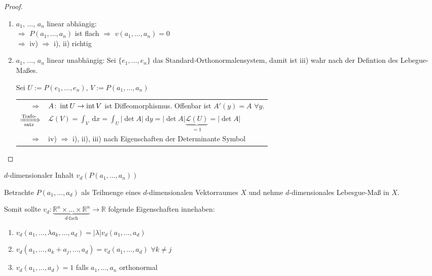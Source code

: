 \begin{proof}\hspace*{0pt}
	\NoEndMark
	\vspace*{-0.8\baselineskip}
	\begin{enumerate}[label={\alph*)}]
		\item $a_1$, $\dotsc$, $a_n$ linear abhängig:\\
		\hspace*{0.5em}$\Rightarrow$ $P(a_1,\dotsc, a_n)$ ist flach $\Rightarrow$ $v(a_1,\dotsc, a_n) = 0$ \\
		\hspace*{0.5em}$\Rightarrow$ iv) $\Rightarrow$ i), ii) richtig
		\item $a_1$, $\dotsc$, $a_n$ linear unabhängig: Sei $\{e_1,\dotsc, e_n\}$ das Standard-Orthonormalensystem, damit ist iii) wahr nach der Defintion des Lebegue-Maßes.
		
		Sei $U := P(e_1,\dotsc, e_n)$, $V:= P(a_1,\dotsc, a_n)$ \\\begin{tabularx}{\linewidth}{r@{$\;\;$}X}
		$\Rightarrow$& $A\colon \operatorname{int} U\to \operatorname{int} V$ ist Diffeomorphismus. Offenbar ist $A'(y) = A$ $\forall y$. \\
		$\xRightarrow[\text{satz}]{\text{Trafo-}}$ & $\displaystyle \mathcal{L}(V) = \int_V \;\mathrm{d}x = \int_U \vert \det A \vert \;\mathrm{d}y = \vert \det A\vert \underbrace{\mathcal{L}(U)}_{=1} = \vert \det A\vert$ \\
		$\Rightarrow$ & iv) $\Rightarrow$ i), ii), iii) nach Eigenschaften der Determinante \hfill \csname\InTheoType Symbol\endcsname
		\end{tabularx}
	\end{enumerate}
\end{proof}

\begin{underlinedenvironment}[Ziel]
	$d$-dimensionaler Inhalt $v_d(P(a_1,\dotsc,a_n))$
\end{underlinedenvironment}
\begin{underlinedenvironment}[Idee]
	Betrachte $P(a_1,\dotsc,a_d)$ als Teilmenge eines $d$-dimensionalen Vektorraumes $X$ und nehme $d$-dimensionales Lebesgue-Maß in $X$.
	
	Somit sollte $v_d\colon\underbrace{\mathbb{R}^n\times \dotsc\times\mathbb{R}^n}_{\text{$d$-fach}}\to\mathbb{R}$ folgende Eigenschaften innehaben:\begin{enumerate}[label={(V\arabic*)}]
		\item $v_d(a_1,\dotsc,\lambda a_k,\dotsc,a_d) = \vert\lambda\vert v_d(a_1,\dotsc,a_d)$
		\item $v_d(a_1,\dotsc, a_k+a_j,\dotsc,a_d) = v_d(a_1,\dotsc, a_d)$ $\forall k\neq j$
		\item $v_d(a_1,\dotsc,a_d) = 1$ falls $a_1,\dotsc,a_n$ orthonormal
	\end{enumerate}
\end{underlinedenvironment}

